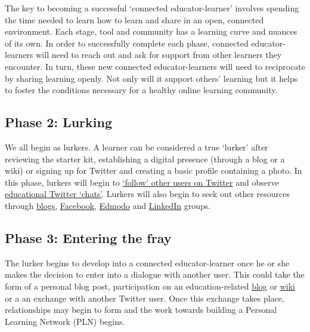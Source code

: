 The key to becoming a successful `connected educator-learner' involves
spending the time needed to learn how to learn and share in an open,
connected environment. Each stage, tool and community has a learning
curve and nuances of its own. In order to successfully complete each
phase, connected educator-learners will need to reach out and ask for
support from other learners they encounter. In turn, these new connected
educator-learners will need to reciprocate by sharing learning openly.
Not only will it support others' learning but it helps to foster the
conditions necessary for a healthy online learning community.

\subsection{Phase 2: Lurking}

We all begin as lurkers. A learner can be considered a true `lurker'
after reviewing the starter kit, establishing a digital presence
(through a blog or a wiki) or signing up for Twitter and creating a
basic profile containing a photo. In this phase, lurkers will begin to
\href{http://www.google.com/url?q=http\%3A\%2F\%2Fwww.fractuslearning.com\%2F2012\%2F05\%2F25\%2Ftwitter-follow-education-technology\%2F\&sa=D\&sntz=1\&usg=AFQjCNF8grPMuRwU\_ImW9Jk3ZYrg0m9KgQ}{`follow'
other users on Twitter} and observe
\href{http://www.google.com/url?q=http\%3A\%2F\%2Fcybraryman.com\%2Fchats.html\&sa=D\&sntz=1\&usg=AFQjCNFJASZiwfvPbfOzFbHvAunpXfNC1g}{educational
Twitter `chats'}. Lurkers will also begin to seek out other resources
through
\href{http://theinnovativeeducator.blogspot.ca/2012/04/ten-best-education-blogs.html}{blogs},
\href{http://www.google.com/url?q=http\%3A\%2F\%2Fwww.edsocialmedia.com\%2F2011\%2F02\%2Fthe-advantage-of-facebook-groups-in-education\%2F\&sa=D\&sntz=1\&usg=AFQjCNEvc43Q7GqJqS-2S8GhEJ53Ye-j4Q}{Facebook},
\href{http://www.slideshare.net/cmsdsquires/edmodo-for-teachers-guide}{Edmodo}
and
\href{http://www.emergingedtech.com/2012/02/8-great-linkedin-groups-for-educators/}{LinkedIn}
groups.

\subsection{Phase 3: Entering the fray}

The lurker begins to develop into a connected educator-learner once he
or she makes the decision to enter into a dialogue with another user.
This could take the form of a personal blog post, participation on an
education-related
\href{http://edudemic.com/2012/08/education-blogs/?utm\_medium=twitter\&utm\_source=twitterfeed}{blog}
or
\href{http://educationalwikis.wikispaces.com/Examples+of+educational+wikis}{wiki}
or a an exchange with another Twitter user. Once this exchange takes
place, relationships may begin to form and the work towards building a
Personal Learning Network (PLN) begins.

